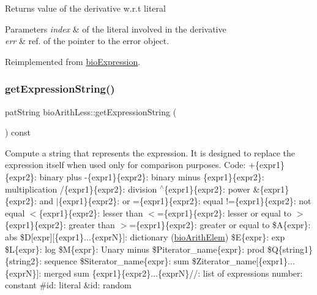 \begin{DoxyReturn}{Returns}
value of the derivative w.\+r.\+t literal 
\end{DoxyReturn}

\begin{DoxyParams}{Parameters}
{\em index} & of the literal involved in the derivative \\
\hline
{\em err} & ref. of the pointer to the error object. \\
\hline
\end{DoxyParams}


Reimplemented from \hyperlink{classbio_expression_a5915579d1193f25f216c1e273c97f2ce}{bio\+Expression}.

\mbox{\label{classbio_arith_less_a8f9d063a00ed8a65ea2b37e3d63405f8}} 
\subsubsection{\texorpdfstring{get\+Expression\+String()}{getExpressionString()}}
{\footnotesize\ttfamily pat\+String bio\+Arith\+Less\+::get\+Expression\+String (\begin{DoxyParamCaption}{ }\end{DoxyParamCaption}) const\hspace{0.3cm}{\ttfamily [virtual]}}

Compute a string that represents the expression. It is designed to replace the expression itself when used only for comparison purposes. Code\+: +\{expr1\}\{expr2\}\+: binary plus -\/\{expr1\}\{expr2\}\+: binary minus \{expr1\}\{expr2\}\+: multiplication /\{expr1\}\{expr2\}\+: division $^\wedge$\{expr1\}\{expr2\}\+: power \&\{expr1\}\{expr2\}\+: and $\vert$\{expr1\}\{expr2\}\+: or =\{expr1\}\{expr2\}\+: equal !=\{expr1\}\{expr2\}\+: not equal $<$\{expr1\}\{expr2\}\+: lesser than $<$=\{expr1\}\{expr2\}\+: lesser or equal to $>$\{expr1\}\{expr2\}\+: greater than $>$=\{expr1\}\{expr2\}\+: greater or equal to \$A\{expr\}\+: abs \$D\mbox{[}expr\mbox{]}\mbox{[}\{expr1\}...\{exprN\}\mbox{]}\+: dictionary (\hyperlink{classbio_arith_elem}{bio\+Arith\+Elem}) \$E\{expr\}\+: exp \$L\{expr\}\+: log \$M\{expr\}\+: Unary minus \$\+Piterator\+\_\+name\{expr\}\+: prod \$Q\{string1\}\{string2\}\+: sequence \$\+Siterator\+\_\+name\{expr\}\+: sum \$\+Ziterator\+\_\+name\mbox{[}\{expr1\}...\{exprN\}\mbox{]}\+: merged sum \{expr1\}\{expr2\}...\{exprN\}//\+: list of expressions number\+: constant \#id\+: literal \&id\+: random 

